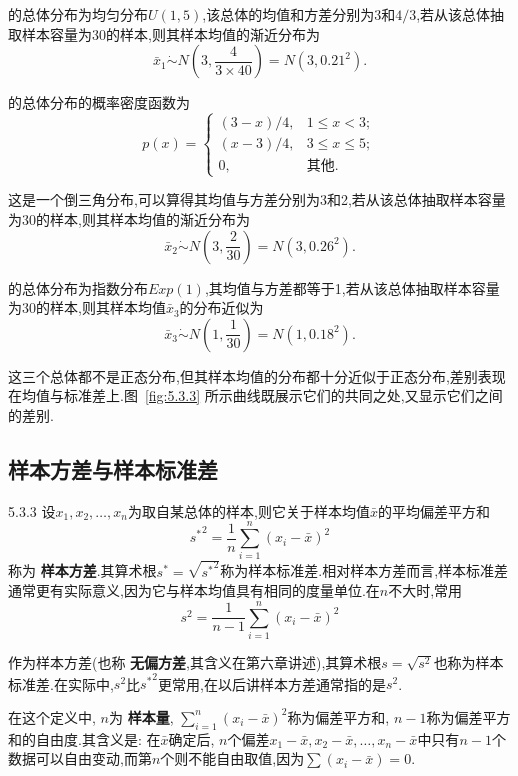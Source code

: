 \begin{example}
的总体分布为均匀分布$U(1,5)$,该总体的均值和方差分别为$3$和$4/3$,若从该总体抽取样本容量为30的样本,则其样本均值的渐近分布为
\[\bar x_1\dot{\sim}N\left(3,\frac4{3\times40}\right)=N(3,0.21^2).\]

的总体分布的概率密度函数为
\[p(x)=\begin{cases}
(3-x)/4,&1\leq x<3;\\
(x-3)/4,&3\leq x\leq 5;\\
0,&\text{其他}.
\end{cases}\]

这是一个倒三角分布,可以算得其均值与方差分别为3和2,若从该总体抽取样本容量为30的样本,则其样本均值的渐近分布为
\[\bar x_2\dot{\sim} N\left(3,\frac{2}{30}\right)=N(3,0.26^2).\]

的总体分布为指数分布$Exp(1)$,其均值与方差都等于1,若从该总体抽取样本容量为30的样本,则其样本均值$\bar x_3$的分布近似为
\[\bar x_3\dot{\sim}N\left(1,\frac1{30}\right)=N(1,0.18^2).\]

这三个总体都不是正态分布,但其样本均值的分布都十分近似于正态分布,差别表现在均值与标准差上.图~\ref{fig:5.3.3} 所示曲线既展示它们的共同之处,又显示它们之间的差别.
\end{example}
\subsection{样本方差与样本标准差\label{ssec:5.3.3}}
\begin{definition}{}{5.3.3}
设$x_1,x_2,\dotsc,x_n$为取自某总体的样本,则它关于样本均值$\bar x$的平均偏差平方和
\begin{equation}\label{eq:5.3.3}
{s^\ast}^2=\frac1n\sum_{i=1}^n(x_i-\bar x)^2
\end{equation}
称为 \textbf{样本方差}.其算术根$s^\ast=\sqrt{{s^\ast}^2}$称为样本标准差.相对样本方差而言,样本标准差通常更有实际意义,因为它与样本均值具有相同的度量单位.在$n$不大时,常用
\begin{equation}\label{eq:5.3.4}
s^2=\frac1{n-1}\sum_{i=1}^n(x_i-\bar x)^2
\end{equation}

作为样本方差(也称 \textbf{无偏方差},其含义在第六章讲述),其算术根$s=\sqrt{s^2}$也称为样本标准差.在实际中,$s^2$比${s^\ast}^2$更常用,在以后讲样本方差通常指的是$s^2$.
\end{definition}

在这个定义中, $n$为 \textbf{样本量}, $\sum_{i=1}^n(x_i-\bar x)^2$称为偏差平方和, $n-1$称为偏差平方和的自由度.其含义是: 在$\bar x$确定后, $n$个偏差$x_1-\bar x,x_2-\bar x,\dotsc,x_n-\bar x$中只有$n-1$个数据可以自由变动,而第$n$个则不能自由取值,因为$\sum(x_i-\bar x)=0$.

